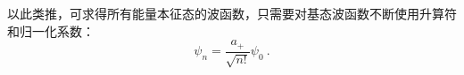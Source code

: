 以此类推，可求得所有能量本征态的波函数，只需要对基态波函数不断使用升算符和归一化系数：%
\begin{equation}
\psi_n = \frac{a_+}{\sqrt {n!}} \psi_0~.
\end{equation}






